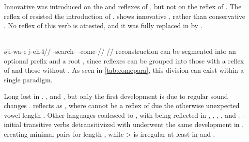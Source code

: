 \subsubsection{ }
\label{sec:come}
Innovative  was introduced on the \ikpeng and \bakairi reflexes of , but not on the \arara reflex of  .
The reflex of  resisted the introduction of \PTir {} .
\carijo {} shows innovative , rather than conservative  .
No \yukpa reflex of this verb is attested, and it was fully replaced in \PWai by  .

\carijo \parencite[][102]{guerrero2019carijo}\\
\begingl
\gla əji-wa-e j-eh-ɨ//
\glb {}-search- -come-//
\glft {}//
\endgl
\xe
%
 reconstruction  can be segmented into an optional prefix  and a root , since reflexes can be grouped into those with a reflex of  and those without .
As seen in \cref{tab:comepara}, this division can exist within a single paradigm.





Long  lost  in \trio, \apalai, and \bakairi, but only the first development is due to regular sound changes \parencite[31--32]{meira1998proto}.
\akuriyo reflects  as , where  cannot be a reflex of  due the otherwise unexpected vowel length \parencite[114--115]{meira1998proto}.
Other languages coalesced  to , with  being reflected in \uxc \parencite[452]{gildea2012classification}, \kalina, \kaxui, \panare, and \yawarana.
-initial transitive verbs detransitivized with  underwent the same development in \kalina, creating minimal pairs for length \parencite[509--510]{meira2010origin}, while  >  is irregular at least in \kaxui and \panare.



